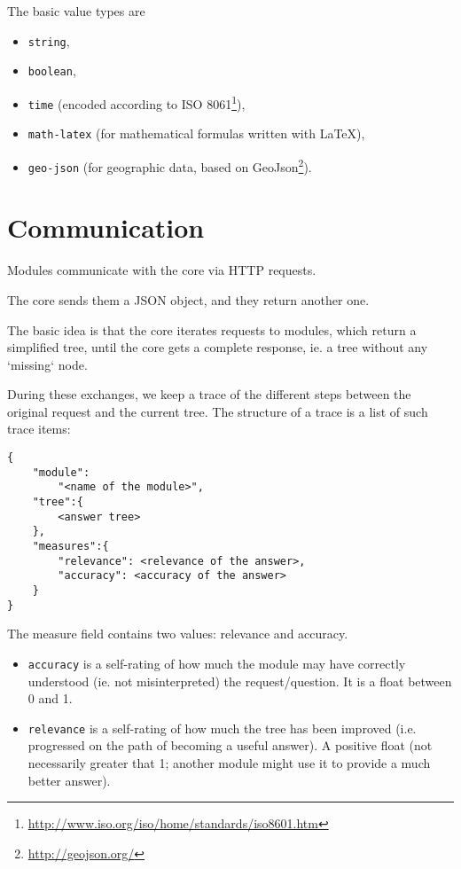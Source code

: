 The basic value types are 
\begin{itemize}
    \item \texttt{string},
    \item \texttt{boolean},
    \item \texttt{time} (encoded according to ISO 8061\footnote{\url{http://www.iso.org/iso/home/standards/iso8601.htm}}),
    \item \texttt{math-latex} (for mathematical formulas written with \LaTeX),
    \item \texttt{geo-json} (for geographic data, based on GeoJson\footnote{\url{http://geojson.org/}}).
\end{itemize}

\section{Communication}

Modules communicate with the core via HTTP requests.

The core sends them a JSON object, and they return another one.

The basic idea is that the core iterates requests to modules, which return a simplified tree, until the core gets a complete response, ie. a tree without any `missing` node.

During these exchanges, we keep a trace of the different steps between the original request and the current tree. The structure of a trace is a list of such trace items:
\begin{verbatim}
{
    "module":
        "<name of the module>", 
    "tree":{
        <answer tree>
    },
    "measures":{
        "relevance": <relevance of the answer>,
        "accuracy": <accuracy of the answer>
    }
}
\end{verbatim}

The measure field contains two values: relevance and accuracy.

\begin{itemize}
    \item \texttt{accuracy} is a self-rating of how much the module may have correctly understood (ie. not misinterpreted) the request/question. It is a float between 0 and 1.
    \item \texttt{relevance} is a self-rating of how much the tree has been improved (i.e. progressed on the path of becoming a useful answer). A positive float (not necessarily greater that 1; another module might use it to provide a much better answer).
\end{itemize}


